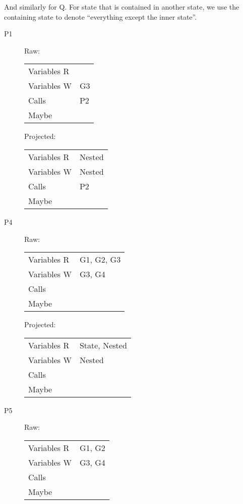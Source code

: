 \documentclass{article}
\begin{document}
\noindent
And similarly for Q. For state that is contained in another state, we use
the containing state to denote ``everything except the inner state''.

\begin{description}
\item[P1]
  \begin{multicols}{2}
    Raw:
    \begin{tabular}{ll}
      Variables R & \\
      Variables W & G3 \\
      Calls       & P2 \\
      Maybe       & \\
    \end{tabular}

    Projected:
    \begin{tabular}{ll}
      Variables R & Nested \\
      Variables W & Nested \\
      Calls       & P2 \\
      Maybe       & \\
    \end{tabular}
  \end{multicols}

\item[P4]
  \begin{multicols}{2}
    Raw:
    \begin{tabular}{ll}
      Variables R & G1, G2, G3 \\
      Variables W & G3, G4 \\
      Calls       & \\
      Maybe       & \\
    \end{tabular}

    Projected:
    \begin{tabular}{ll}
      Variables R & State, Nested \\
      Variables W & Nested \\
      Calls       & \\
      Maybe       & \\
    \end{tabular}
  \end{multicols}

\item[P5]
  \begin{multicols}{2}
    Raw:
    \begin{tabular}{ll}
      Variables R & G1, G2 \\
      Variables W & G3, G4 \\
      Calls       & \\
      Maybe       & \\
    \end{tabular}


\end{multicols}
\end{description}
\end{document}

